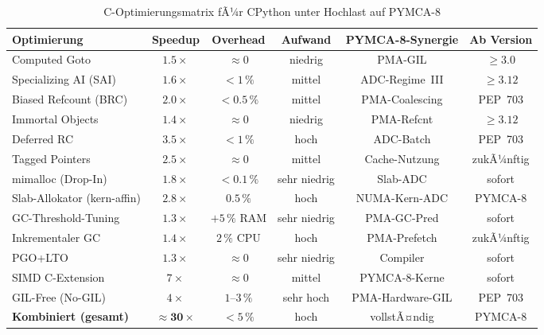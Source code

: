 ﻿\documentclass[a4paper,12pt]{scrreprt}
\theoremstyle{definition}
\begin{document}
	\begin{table}
		\centering
		\caption{C-Optimierungsmatrix fÃ¼r CPython unter Hochlast auf PYMCA-8}
		\label{tab:optimization_matrix}
		\renewcommand{\arraystretch}{1.35}
		\begin{tabular}{p{3.8cm}ccccc}
			\toprule
			\textbf{Optimierung} & \textbf{Speedup} & \textbf{Overhead} &
			\textbf{Aufwand} & \textbf{PYMCA-8-Synergie} &
			\textbf{Ab Version} \\
			\midrule
			Computed Goto         & $1.5\times$  & $\approx 0$  & niedrig  &
			PMA-GIL & $\ge 3.0$ \\
			Specializing AI (SAI) & $1.6\times$  & $< 1\,\%$    & mittel   &
			ADC-Regime~III & $\ge 3.12$ \\
			Biased Refcount (BRC) & $2.0\times$  & $< 0.5\,\%$  & mittel   &
			PMA-Coalescing & PEP~703 \\
			Immortal Objects      & $1.4\times$  & $\approx 0$  & niedrig  &
			PMA-Refcnt & $\ge 3.12$ \\
			Deferred RC           & $3.5\times$  & $< 1\,\%$    & hoch     &
			ADC-Batch & PEP~703 \\
			Tagged Pointers       & $2.5\times$  & $\approx 0$  & mittel   &
			Cache-Nutzung & zukÃ¼nftig \\
			mimalloc (Drop-In)    & $1.8\times$  & $< 0.1\,\%$  & sehr niedrig &
			Slab-ADC & sofort \\
			Slab-Allokator (kern-affin) & $2.8\times$ & $0.5\,\%$ & hoch   &
			NUMA-Kern-ADC & PYMCA-8 \\
			GC-Threshold-Tuning   & $1.3\times$  & $+5\,\%$ RAM & sehr niedrig &
			PMA-GC-Pred & sofort \\
			Inkrementaler GC      & $1.4\times$  & $2\,\%$ CPU  & hoch     &
			PMA-Prefetch & zukÃ¼nftig \\
			PGO+LTO               & $1.3\times$  & $\approx 0$  & sehr niedrig &
			Compiler & sofort \\
			SIMD C-Extension      & $7\times$    & $\approx 0$  & mittel   &
			PYMCA-8-Kerne & sofort \\
			GIL-Free (No-GIL)     & $4\times$    & $1\text{--}3\,\%$ & sehr hoch &
			PMA-Hardware-GIL & PEP~703 \\
			\midrule
			\textbf{Kombiniert (gesamt)} & $\mathbf{\approx 30\times}$ &
			$<5\,\%$ & hoch & vollstÃ¤ndig & PYMCA-8 \\
			\bottomrule
		\end{tabular}
	\end{table}
	
\end{document}
